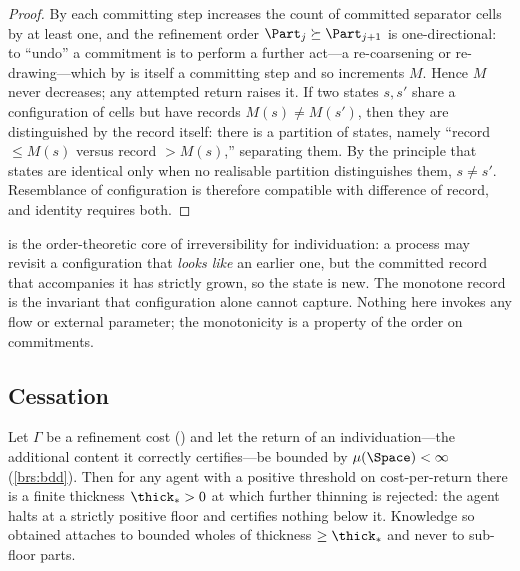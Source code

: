 \begin{proof}
By  each committing step increases the count of
committed separator cells by at least one, and the refinement order
$\Part_j\succeq\Part_{j+1}$ is one-directional: to ``undo'' a commitment is to
perform a further act---a re-coarsening or re-drawing---which by
 is itself a committing step and so increments $M$. Hence $M$
never decreases; any attempted return raises it. If two states $s,s'$ share a
configuration of cells but have records $M(s)\neq M(s')$, then they are
distinguished by the record itself: there is a partition of states, namely
``record $\le M(s)$ versus record $>M(s)$,'' separating them. By the principle
that states are identical only when no realisable partition distinguishes them,
$s\neq s'$. Resemblance of configuration is therefore compatible with difference
of record, and identity requires both.
\end{proof}

\begin{remark}
\label{rem:resemblance}
 is the order-theoretic core of irreversibility for
individuation: a process may revisit a configuration that \emph{looks like} an
earlier one, but the committed record that accompanies it has strictly grown, so
the state is new. The monotone record is the invariant that configuration alone
cannot capture. Nothing here invokes any flow or external parameter; the
monotonicity is a property of the order on commitments.
\end{remark}

\subsection{Cessation}

\begin{theorem}
\label{thm:cessation}
Let $\Gamma$ be a refinement cost \textup{(}\textup{)} and let the
return of an individuation---the additional content it correctly certifies---be
bounded by $\mu(\Space)<\infty$ \textup{(}\ref{brs:bdd}\textup{)}. Then for any
agent with a positive threshold on cost-per-return there is a finite thickness
$\thick_\ast>0$ at which further thinning is rejected: the agent halts at a
strictly positive floor and certifies nothing below it. Knowledge so obtained
attaches to bounded wholes of thickness $\ge\thick_\ast$ and never to sub-floor
parts.
\end{theorem}

